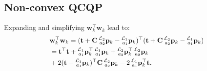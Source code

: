 \documentclass[journal]{IEEEtran}
\def\LocPosHost{\prescript{\mathcal{L}_1}{a_1}{\mathbf{p}}} %
\def\LocPosTarg{\prescript{\mathcal{L}_2}{a_2}{\mathbf{p}}} %
\begin{document}
\subsection{Non-convex QCQP} \label{subsec:main_approaches_QCQP}

Expanding and simplifying $\mathbf{w}_k^\top \mathbf{w}_k$ lead to:
\begin{equation}\label{eq:squared_dist_full_form}
\begin{aligned}
    &\mathbf{w}_k^\top \mathbf{w}_k = (\mathbf{t} + \mathbf{C} \LocPosTarg_k - \LocPosHost_k)^\top (\mathbf{t} + \mathbf{C} \LocPosTarg_k - \LocPosHost_k)\\
    &= \mathbf{t}^\top \mathbf{t} + \LocPosHost_k^\top \LocPosHost_k + \LocPosTarg_k^\top \LocPosTarg_k \\
    &+ 2 (\mathbf{t} - \LocPosHost_k)^\top \mathbf{C} \LocPosTarg_k - 2 \LocPosHost_k^\top \mathbf{t}.
\end{aligned}
\end{equation}
\end{document}
